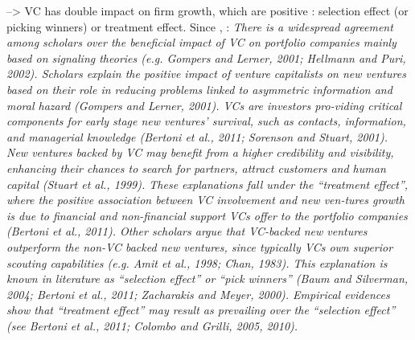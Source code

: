 \begin{itemize}
\begin{itemize}
\begin{itemize}
    --> VC has double impact on firm growth, which are positive : selection effect (or picking winners) or treatment effect. Since \citet{cavallo2019fostering}, : \textit{There is a widespread agreement among scholars over the beneficial impact of VC on portfolio companies mainly based on signaling theories (e.g. Gompers and Lerner, 2001; Hellmann and Puri, 2002). Scholars explain the positive impact of venture capitalists on new ventures based on their role in reducing problems linked to asymmetric information and moral hazard (Gompers and Lerner, 2001). VCs are investors pro-viding critical components for early stage new ventures' survival, such as contacts, information, and managerial knowledge (Bertoni et al., 2011; Sorenson and Stuart, 2001). New ventures backed by VC may benefit from a higher credibility and visibility, enhancing their chances to search for partners, attract customers and human capital (Stuart et al., 1999). These explanations fall under the “treatment effect”, where the positive association between VC involvement and new ven-tures growth is due to financial and non-financial support VCs offer to the portfolio companies (Bertoni et al., 2011). Other scholars argue that VC-backed new ventures outperform the non-VC backed new ventures, since typically VCs own superior scouting capabilities (e.g. Amit et al., 1998; Chan, 1983). This explanation is known in literature as “selection effect” or “pick winners” (Baum and Silverman, 2004; Bertoni et al., 2011; Zacharakis and Meyer, 2000). Empirical evidences show that “treatment effect” may result as prevailing over the “selection effect” (see Bertoni et al., 2011; Colombo and Grilli, 2005, 2010).}

\end{itemize}
\end{itemize}
\end{itemize}
